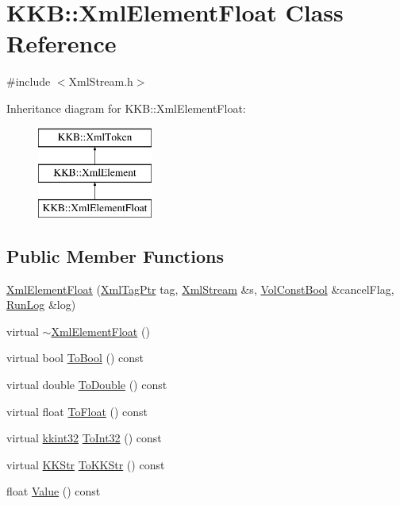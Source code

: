 \hypertarget{class_k_k_b_1_1_xml_element_float}{}\section{K\+KB\+:\+:Xml\+Element\+Float Class Reference}
\label{class_k_k_b_1_1_xml_element_float}


{\ttfamily \#include $<$Xml\+Stream.\+h$>$}

Inheritance diagram for K\+KB\+:\+:Xml\+Element\+Float\+:\begin{figure}[H]
\begin{center}
\leavevmode
\includegraphics[height=3.000000cm]{class_k_k_b_1_1_xml_element_float}
\end{center}
\end{figure}
\subsection*{Public Member Functions}
\begin{DoxyCompactItemize}
\item 
\hyperlink{class_k_k_b_1_1_xml_element_float_a90da502783535e98a181c6fb94e52f65}{Xml\+Element\+Float} (\hyperlink{namespace_k_k_b_a9253a3ea8a5da18ca82be4ca2b390ef0}{Xml\+Tag\+Ptr} tag, \hyperlink{class_k_k_b_1_1_xml_stream}{Xml\+Stream} \&s, \hyperlink{namespace_k_k_b_a7d390f568e2831fb76b86b56c87bf92f}{Vol\+Const\+Bool} \&cancel\+Flag, \hyperlink{class_k_k_b_1_1_run_log}{Run\+Log} \&log)
\item 
virtual \hyperlink{class_k_k_b_1_1_xml_element_float_a7aca06af60563b1ccafb4ef035098455}{$\sim$\+Xml\+Element\+Float} ()
\item 
virtual bool \hyperlink{class_k_k_b_1_1_xml_element_float_a6a72dc8d2ebd6750787a07db8193e188}{To\+Bool} () const 
\item 
virtual double \hyperlink{class_k_k_b_1_1_xml_element_float_a4e0d90e5b74565ef0fb03cee7cdbc852}{To\+Double} () const 
\item 
virtual float \hyperlink{class_k_k_b_1_1_xml_element_float_a5967c539026d748db052c9035cc9ebe8}{To\+Float} () const 
\item 
virtual \hyperlink{namespace_k_k_b_a8fa4952cc84fda1de4bec1fbdd8d5b1b}{kkint32} \hyperlink{class_k_k_b_1_1_xml_element_float_a1ecd7c407ad5f26064e90fada52270c4}{To\+Int32} () const 
\item 
virtual \hyperlink{class_k_k_b_1_1_k_k_str}{K\+K\+Str} \hyperlink{class_k_k_b_1_1_xml_element_float_a95b717baacf55c1fa8a17ef7744c7915}{To\+K\+K\+Str} () const 
\item 
float \hyperlink{class_k_k_b_1_1_xml_element_float_a321fdfd30f4be44de3bf7e85691c0ba4}{Value} () const 
\end{DoxyCompactItemize}
